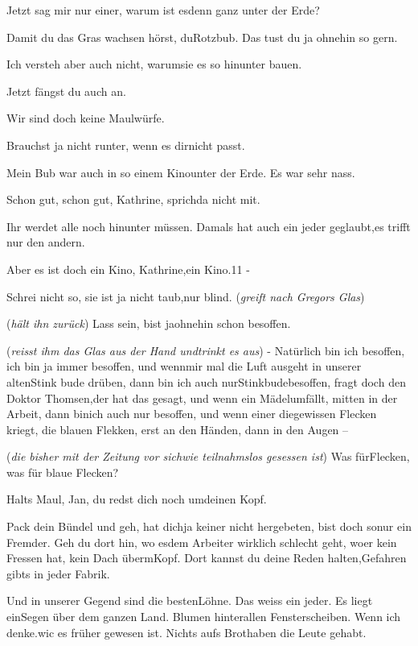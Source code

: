 \documentclass[
	final,
	a4paper,
	ngerman,
	mpinclude = true, %
	twoside = true,
	open = right,
	cleardoublepage = plain,
	DIV = 13,
	BCOR = 1cm,
	titlepage = firstiscover,
	]{scrbook}
\newcommand{\direction}[1]{(\textit{#1})}
\newcommand{\thecharacter}[1]{\textup{\textsc{#1}}\xspace}
\newcommand{\theBarbara}{\thecharacter{Barbara}}
\newcommand{\theJosef}{\thecharacter{Josef}}
\newcommand{\theKathrine}{\thecharacter{Kathrine}}
\newcommand{\theGregor}{\thecharacter{Gregor}}
\newcommand{\theJan}{\thecharacter{Jan}}
\newcommand{\theAndreas}{\thecharacter{Andreas}}
\newcommand{\theLuise}{\thecharacter{Luise}}
\newcommand{\character}[1]{\item[#1]}
\newcommand{\Barbara}{\character{\theBarbara}}
\newcommand{\Josef}{\character{\theJosef}}
\newcommand{\Kathrine}{\character{\theKathrine}}
\newcommand{\Gregor}{\character{\theGregor}}
\newcommand{\Jan}{\character{\theJan}}
\newcommand{\Andreas}{\character{\theAndreas}}
\newcommand{\Luise}{\character{\theLuise}}
\begin{document}
\begin{play}
\Jan
Jetzt sag mir nur einer, warum ist esdenn ganz unter der Erde?

\Gregor
Damit du das Gras wachsen hörst, duRotzbub. Das tust du ja ohnehin so gern.

\Andreas
Ich versteh aber auch nicht, warumsie es so hinunter bauen.

\Gregor
Jetzt fängst du auch an.

\Jan
Wir sind doch keine Maulwürfe.

\Gregor
Brauchst ja nicht runter, wenn es dirnicht passt.

\Kathrine
Mein Bub war auch in so einem Kinounter der Erde. Es war sehr nass.

\Josef
Schon gut, schon gut, Kathrine, sprichda nicht mit.

\Kathrine
Ihr werdet alle noch hinunter müssen. Damals hat auch ein jeder geglaubt,es trifft nur den andern.

\Josef
Aber es ist doch ein Kino, Kathrine,ein Kino.11 -

\Jan
Schrei nicht so, sie ist ja nicht taub,nur blind. \direction{greift nach Gregors Glas}

\Gregor
\direction{hält ihn zurück} Lass sein, bist jaohnehin schon besoffen.

\Jan
\direction{reisst ihm das Glas aus der Hand undtrinkt es aus} - Natürlich bin ich besoffen, ich bin ja immer besoffen, und wennmir mal die Luft ausgeht in unserer altenStink bude drüben, dann bin ich auch nurStinkbudebesoffen, fragt doch den Doktor Thomsen,der hat das gesagt, und wenn ein Mädelumfällt, mitten in der Arbeit, dann binich auch nur besoffen, und wenn einer diegewissen Flecken kriegt, die blauen Flekken, erst an den Händen, dann in den Augen --

\Barbara
\direction{die bisher mit der Zeitung vor sichwie teilnahmslos gesessen ist} Was fürFlecken, was für blaue Flecken?

\Luise
Halts Maul, Jan, du redst dich noch umdeinen Kopf.

\Gregor
Pack dein Bündel und geh, hat dichja keiner nicht hergebeten, bist doch sonur ein Fremder. Geh du dort hin, wo esdem Arbeiter wirklich schlecht geht, woer kein Fressen hat, kein Dach übermKopf. Dort kannst du deine Reden halten,Gefahren gibts in jeder Fabrik.

\Josef
Und in unserer Gegend sind die bestenLöhne. Das weiss ein jeder. Es liegt einSegen über dem ganzen Land. Blumen hinterallen Fensterscheiben. Wenn ich denke.wic es früher gewesen ist. Nichts aufs Brothaben die Leute gehabt.


\end{play}
\end{document}
